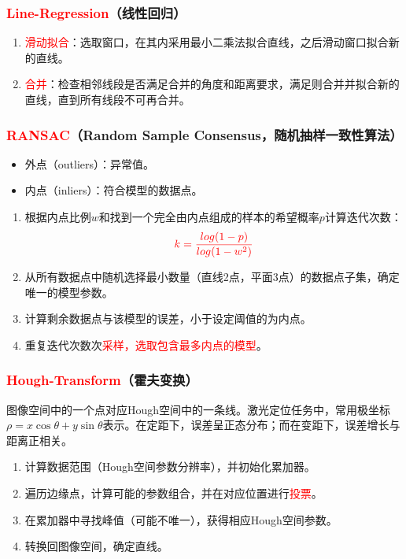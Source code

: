 \documentclass[
12pt, %
a4paper, 
oneside, %
]{scrartcl}
\begin{document}
\subsubsection[Line-Regression]{\textcolor{red}{Line-Regression}（线性回归）}
\begin{enumerate}
\item \textcolor{red}{滑动拟合}：选取窗口，在其内采用最小二乘法拟合直线，之后滑动窗口拟合新的直线。
\item \textcolor{red}{合并}：检查相邻线段是否满足合并的角度和距离要求，满足则合并并拟合新的直线，直到所有线段不可再合并。
\end{enumerate}
\subsubsection[RANSAC]{\textcolor{red}{RANSAC}（Random Sample Consensus，随机抽样一致性算法）}
\begin{itemize}
\item 外点（outliers）：异常值。
\item 内点（inliers）：符合模型的数据点。
\end{itemize}
\begin{enumerate}
\item 根据内点比例$ w $和找到一个完全由内点组成的样本的希望概率$ p $计算迭代次数：
$$ \textcolor{red}{k = \frac{log(1 - p)}{log(1 - w^2)}} $$
\item 从所有数据点中随机选择最小数量（直线2点，平面3点）的数据点子集，确定唯一的模型参数。
\item 计算剩余数据点与该模型的误差，小于设定阈值的为内点。
\item 重复迭代次数次\textcolor{red}{采样，选取包含最多内点的模型}。
\end{enumerate}
\subsubsection[Hough-Transform]{\textcolor{red}{Hough-Transform}（霍夫变换）}
图像空间中的一个点对应Hough空间中的一条线。激光定位任务中，常用极坐标$ \rho = x \cos\theta + y \sin\theta $表示。在定距下，误差呈正态分布；而在变距下，误差增长与距离正相关。
\begin{enumerate}
\item 计算数据范围（Hough空间参数分辨率），并初始化累加器。
\item 遍历边缘点，计算可能的参数组合，并在对应位置进行\textcolor{red}{投票}。
\item 在累加器中寻找峰值（可能不唯一），获得相应Hough空间参数。
\item 转换回图像空间，确定直线。
\end{enumerate}
\end{document}
